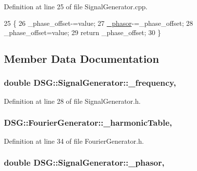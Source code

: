 Definition at line 25 of file Signal\+Generator.\+cpp.


\begin{DoxyCode}
25                                                                 \{
26     \_phase\_offset-=value;
27     \hyperlink{classDSG_1_1SignalGenerator_ac2271b582bf699275f077ecb642a8cd9}{\_phasor}-=\_phase\_offset;
28     \_phase\_offset=value;
29     \textcolor{keywordflow}{return} \_phase\_offset;
30 \}\end{DoxyCode}


\subsection{Member Data Documentation}
\hypertarget{classDSG_1_1SignalGenerator_a67e296e3506dcdf09402c667cddff9ac}{
\subsubsection[{\+\_\+frequency}]{\setlength{\rightskip}{0pt plus 5cm}double D\+S\+G\+::\+Signal\+Generator\+::\+\_\+frequency\hspace{0.3cm}{\ttfamily [protected]}, {\ttfamily [inherited]}}}\label{classDSG_1_1SignalGenerator_a67e296e3506dcdf09402c667cddff9ac}


Definition at line 28 of file Signal\+Generator.\+h.

\hypertarget{classDSG_1_1FourierGenerator_a7288408f8e44d5edb5eecc62480243d7}{
\subsubsection[{\+\_\+harmonic\+Table}]{ D\+S\+G\+::\+Fourier\+Generator\+::\+\_\+harmonic\+Table\hspace{0.3cm}{\ttfamily [static]}, {\ttfamily [protected]}}}\label{classDSG_1_1FourierGenerator_a7288408f8e44d5edb5eecc62480243d7}


Definition at line 34 of file Fourier\+Generator.\+h.

\hypertarget{classDSG_1_1SignalGenerator_ac2271b582bf699275f077ecb642a8cd9}{
\subsubsection[{\+\_\+phasor}]{\setlength{\rightskip}{0pt plus 5cm}double D\+S\+G\+::\+Signal\+Generator\+::\+\_\+phasor\hspace{0.3cm}{\ttfamily [protected]}, {\ttfamily [inherited]}}}\label{classDSG_1_1SignalGenerator_ac2271b582bf699275f077ecb642a8cd9}


